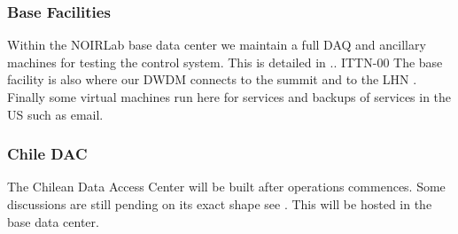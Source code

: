 \subsubsection{Base Facilities}
Within the NOIRLab base data center we maintain a full DAQ and ancillary machines for testing the control system.
This is detailed in .. ITTN-00
The base facility is also where our DWDM connects to the summit and to the LHN .
Finally some virtual machines run here for services and backups of services in the US such as email.


\subsubsection{Chile DAC}

The Chilean Data Access Center will be built after operations commences.
Some discussions are still pending on its exact shape see .
This will be hosted in the base data center.

